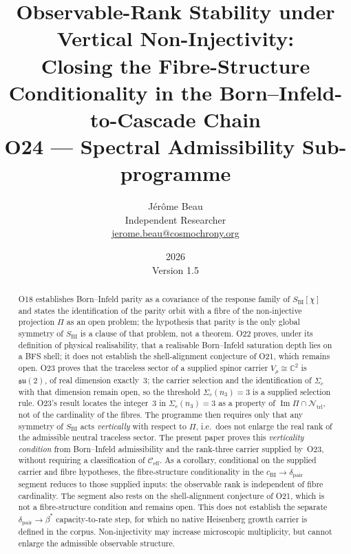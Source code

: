 \documentclass[11pt,a4paper]{article}
\newcommand{\bstar}{\beta^*}
\newcommand{\dpair}{\delta_{\mathrm{pair}}}
\newcommand{\Ntrl}{\mathcal{N}_{\mathrm{trl}}}
\newcommand{\SBI}{S_{\mathrm{BI}}}
\newcommand{\cchi}{c_{\mathrm{BI}}}
\begin{document}
  \title{Observable-Rank Stability under Vertical Non-Injectivity:\\
  Closing the Fibre-Structure Conditionality in the
  Born--Infeld-to-Cascade Chain\\[6pt]
    {\large O24 --- Spectral Admissibility Sub-programme}}

  \author{J\'er\^ome Beau\\
  \small Independent Researcher\\
  \small \href{mailto:jerome.beau@cosmochrony.org}{jerome.beau@cosmochrony.org}}

  \date{2026\\Version 1.5}

  \maketitle

  \begin{abstract}
    O18 establishes Born--Infeld parity as a covariance of the response family of $\SBI[\chi]$ and states
    the identification of the parity orbit with a fibre of the non-injective projection $\Pi$
    as an open problem; the hypothesis that parity is the only global symmetry of $\SBI$ is a
    clause of that problem, not a theorem.
    O22 proves, under its definition of physical realisability, that a realisable Born--Infeld
    saturation depth lies on a BFS shell; it does not establish the shell-alignment conjecture
    of O21, which remains open.
    O23 proves that the traceless sector of a supplied spinor carrier
    $V_\rho \cong \mathbb{C}^2$ is $\mathfrak{su}(2)$, of real dimension exactly~$3$; the
    carrier selection and the identification of $\Sigma_c$ with that dimension remain open, so
    the threshold $\Sigma_c(n_3) = 3$ is a supplied selection rule.
    O23's result locates the integer~$3$ in $\Sigma_c(n_3) = 3$ as a property of
    $\operatorname{Im}\Pi \cap \Ntrl$, not of the cardinality of the fibres.
    The programme then requires only that
    any symmetry of $\SBI$ acts \emph{vertically} with respect to $\Pi$, i.e.\ does not enlarge
    the real rank of the admissible neutral traceless sector.
    The present paper proves this \emph{verticality condition} from Born--Infeld
    admissibility and the rank-three carrier supplied by~O23, without requiring a
    classification of $\mathcal{C}_{\mathrm{eff}}$.
    As a corollary, conditional on the supplied carrier and fibre hypotheses, the
    fibre-structure conditionality in the $\cchi \to \dpair$ segment reduces to those supplied
    inputs: the observable rank is independent of fibre cardinality.
    The segment also rests on the shell-alignment conjecture of O21, which is not a
    fibre-structure condition and remains open.
    This does not establish the separate
    $\dpair \to \bstar$ capacity-to-rate step, for which no native
    Heisenberg growth carrier is defined in the corpus.
    Non-injectivity may increase microscopic multiplicity, but cannot enlarge the admissible
    observable structure.
  \end{abstract}
\end{document}
